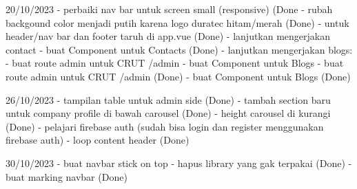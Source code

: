 20/10/2023
    - perbaiki nav bar untuk screen small (responsive) (Done
    - rubah backgound color menjadi putih karena logo duratec hitam/merah (Done)
    - untuk header/nav bar dan footer taruh di app.vue (Done)
    - lanjutkan mengerjakan contact
         - buat Component untuk Contacts (Done)
    - lanjutkan mengerjakan blogs:
        - buat route admin untuk CRUT   /admin
        - buat Component untuk Blogs
        - buat route admin untuk CRUT   /admin (Done)
        - buat Component untuk Blogs (Done)
    
26/10/2023
   - tampilan table untuk admin side (Done)
   - tambah section baru untuk company profile di bawah carousel (Done)
   - height carousel di kurangi (Done)
   - pelajari firebase auth (sudah bisa login dan register menggunakan firebase auth)
   - loop content header (Done)

30/10/2023
   - buat navbar stick on top
   - hapus library yang gak terpakai (Done)
   - buat marking navbar (Done)
